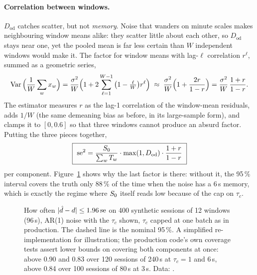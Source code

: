 \paragraph{Correlation between windows.} $D_{\mathrm{od}}$ catches scatter, but not
\emph{memory}. Noise that wanders on minute scales makes neighbouring window means
alike: they scatter little about each other, so $D_{\mathrm{od}}$ stays near one, yet the pooled
mean is far less certain than $W$ independent windows would make it. The
factor for window means with lag-$\ell$ correlation $r^\ell$, summed as a geometric series,
\[
  \operatorname{Var}\Big(\frac1W\sum_w x_w\Big) = \frac{\sigma^2}{W}\Big(1 + 2\sum_{\ell=1}^{W-1}\big(1-\tfrac{\ell}{W}\big)r^\ell\Big)
  \;\approx\; \frac{\sigma^2}{W}\Big(1 + \frac{2r}{1-r}\Big) = \frac{\sigma^2}{W}\,\frac{1+r}{1-r}.
\]
The estimator measures $r$ as the lag-1 correlation of the window-mean residuals,
adds $1/W$ (the same demeaning bias as before, in its large-sample form), and clamps
it to $[0, 0.6]$ so that three windows cannot produce an absurd factor. Putting
the three pieces together,
\[
  \boxed{\ \mathrm{se}^2 = \frac{S_0}{\sum_w T_w}\cdot\max(1, D_{\mathrm{od}})\cdot\frac{1+r}{1-r}\ }
\]
per component. Figure~\ref{fig:cond-coverage} shows why the last factor is there:
without it, the 95\,\% interval covers the truth only 88\,\% of the time when the
noise has a 6\,s memory, which is exactly the regime where $S_0$ itself reads
low because of the cap on $\tau_c$.

\begin{figure}[ht]
\centering
{}
\caption{How often $|\hat d - d| \le 1.96\,\mathrm{se}$ on 400 synthetic sessions of
12 windows (96\,s), AR(1) noise with the $\tau_c$ shown, $\tau_c$ capped at one
batch as in production. The dashed line is the nominal 95\,\%. A simplified
re-implementation for illustration; the production code's own coverage tests
assert lower bounds on covering both components at once: above 0.90 and 0.83 over
120 sessions of 240\,s at $\tau_c = 1$ and 6\,s, above 0.84 over 100 sessions of
80\,s at 3\,s. Data:
.}
\label{fig:cond-coverage}
\end{figure}

